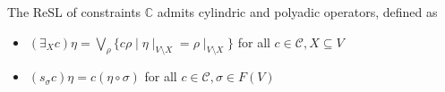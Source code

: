 \documentclass{llncs}
\def\monop{\otimes}
\def\odiv{\, {\ominus\hspace{-7.7pt} \div} \,}
\begin{document}
%
%
%
%


\begin{lemma}
	The ReSL of constraints $\mathbb{C}$ admits cylindric and polyadic operators, defined as
	\begin{itemize}
		\item  $(\exists_X c) \eta = \bigvee_\rho \{c \rho \mid \eta\mid_{V \setminus X} = \rho\mid_{V \setminus X}\}$ 
		         for all $c \in {\mathcal C}, X \subseteq V$
		\item  $(s_\sigma c) \eta = c (\eta \circ \sigma)$ for all $c \in {\mathcal C}, \sigma \in F(V)$		
	\end{itemize}
\end{lemma}
\end{document}
